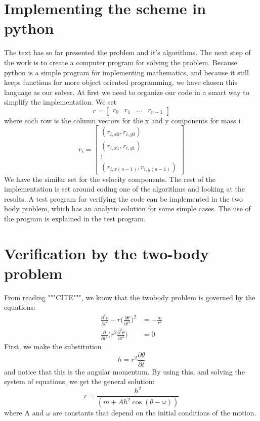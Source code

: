 \documentclass{article}
\begin{document}
\section{Implementing the scheme in python}
The text has so far presented the problem and it's algorithms. The next step of the work is to create a computer program for solving the problem. Because python is a simple program for implementing mathematics, and because it still keeps functions for more object oriented programming, we have chosen this language as our solver. At first we need to organize our code in a smart way to simplify the implementation. We set
\begin{equation}
r = 
\begin{bmatrix}
r_0 & r_1 & \ldots & r_{n-1}
\end{bmatrix}
\end{equation}
where each row is the column vectors for the x and y components for mass i
\begin{equation}
r_i = 
\begin{bmatrix}
(r_{i,x0},r_{i,y0}) \\ (r_{i,x1},r_{i,y1}) \\ \vdots \\(r_{i,x(n-1)},r_{i,y(n-1)})
\end{bmatrix}
\end{equation}
We have the similar set for the velocity components. The rest of the implementation is set around coding one of the algorithms and looking at the results. A test program for verifying the code can be implemented in the two body problem, which has an analytic solution for some simple cases. The use of the program is explained in the test program.
\section{Verification by the two-body problem}
From reading """CITE""", we know that the twobody problem is governed by the equations:
\begin{align}
\frac{\partial^2 r}{\partial t^2} - r\big(\frac{\partial\theta}{\partial t^2}\big)^2 &= -\frac{m}{r^2} \\
\frac{\partial}{\partial t^2}\big(r^2\frac{\partial^2\theta}{\partial t^2}\big) &= 0
\end{align}
First, we make the substitution
\begin{equation}
h = r^2\frac{\partial \theta}{\partial t}
\end{equation}
and notice that this is the angular momentum. By using this, and solving the system of equations, we get the general solution:
\begin{equation}
r = \frac{h^2}{(m + Ah^2\cos(\theta - \omega))}
\end{equation}
where A and $\omega$ are constants that depend on the initial conditions of
the motion.
\end{document}
